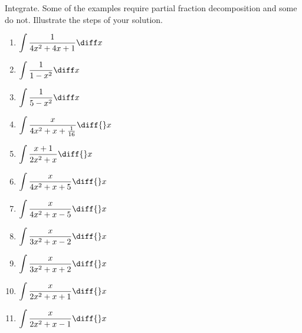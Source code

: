 Integrate. Some of the examples require partial fraction decomposition and some do not. Illustrate the steps of your solution. 
\begin{multicols}{2}
\begin{enumerate}[ref={\fcProblemRef}]
\item $\displaystyle\int \frac{1}{4x^2+4x+1}\diff x$

\item $\displaystyle \int \frac{1}{1-x^2}\diff x$


\item $\displaystyle \int \frac{1}{5-x^2}\diff x$

\item $\displaystyle \int \frac{x}{4x^2 +x+ \frac{ 1}{16}}\diff {}x$

\item $\displaystyle \int \frac{x+1}{2x^2+x}\diff {}x$

\item $\displaystyle \int \frac{x}{4x^2+x+5}\diff {}x$

\item $\displaystyle \int \frac{x}{4x^2+x-5}\diff {}x$

\item $\displaystyle \int \frac{x }{3x^2+x-2}\diff{}x$

\item $\displaystyle \int \frac{x }{3x^2+x+2}\diff{}x$

\item $\displaystyle \int \frac{x}{2x^2+x+1}\diff {}x$

\item \label{problemIntegrate x/(2x^2+x-1)dx}
$\displaystyle\int \frac{x }{2x^2+x-1}\diff{}x
$


\end{enumerate}
\end{multicols}
